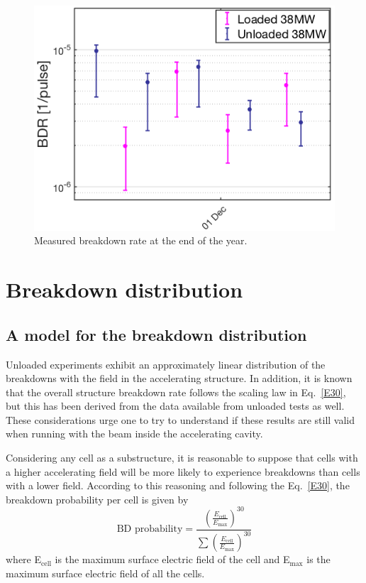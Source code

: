 \begin{figure}[h]
\centering 
\includegraphics[scale=0.55]{pictures/BDR_last_part_year.png}
\caption{Measured breakdown rate at the end of the year.}
\label{BD_prob_last_raise}
\end{figure}





\section[Breakdown distribution]{Breakdown distribution}

\subsection[A model for the breakdown distribution]{A model for the breakdown distribution}

Unloaded experiments exhibit an approximately linear distribution of the breakdowns with the field in the accelerating structure. In addition, it is known that the overall structure breakdown rate follows the scaling law in Eq.~\ref{E30}, but this has been derived from the data available from unloaded tests as well. These considerations urge one to try to understand if these results are still valid when running with the beam inside the accelerating cavity.

Considering any cell as a substructure, it is reasonable to suppose that cells with a higher accelerating field will be more likely to experience breakdowns than cells with a lower field. According to this reasoning and following the Eq.~\ref{E30}, the breakdown probability per cell is given by
\begin{equation}
\text{BD probability} =\frac{   \left ( \frac{E_\text{cell}}{E_\text{max}} \right )^{30} }{ \sum \left( \frac{E_\text{cell}}{E_\text{max}} \right )^{30}   } 
\label{scal_eq_prob}
\end{equation}
where E$_\text{cell}$ is the maximum surface electric field of the cell and E$_\text{max}$ is the maximum surface electric field of all the cells. 

